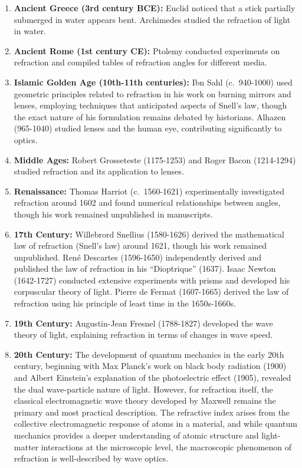 \documentclass[
  a4paper,
]{book}
\begin{document}
\begin{tcolorbox}
\begin{enumerate}
\def\labelenumi{\arabic{enumi}.}
\item
  \textbf{Ancient Greece (3rd century BCE):} Euclid noticed that a stick
  partially submerged in water appears bent. Archimedes studied the
  refraction of light in water.
\item
  \textbf{Ancient Rome (1st century CE):} Ptolemy conducted experiments
  on refraction and compiled tables of refraction angles for different
  media.
\item
  \textbf{Islamic Golden Age (10th-11th centuries):} Ibn Sahl
  (c.~940-1000) used geometric principles related to refraction in his
  work on burning mirrors and lenses, employing techniques that
  anticipated aspects of Snell's law, though the exact nature of his
  formulation remains debated by historians. Alhazen (965-1040) studied
  lenses and the human eye, contributing significantly to optics.
\item
  \textbf{Middle Ages:} Robert Grosseteste (1175-1253) and Roger Bacon
  (1214-1294) studied refraction and its application to lenses.
\item
  \textbf{Renaissance:} Thomas Harriot (c.~1560-1621) experimentally
  investigated refraction around 1602 and found numerical relationships
  between angles, though his work remained unpublished in manuscripts.
\item
  \textbf{17th Century:} Willebrord Snellius (1580-1626) derived the
  mathematical law of refraction (Snell's law) around 1621, though his
  work remained unpublished. René Descartes (1596-1650) independently
  derived and published the law of refraction in his ``Dioptrique''
  (1637). Isaac Newton (1642-1727) conducted extensive experiments with
  prisms and developed his corpuscular theory of light. Pierre de Fermat
  (1607-1665) derived the law of refraction using his principle of least
  time in the 1650s-1660s.
\item
  \textbf{19th Century:} Augustin-Jean Fresnel (1788-1827) developed the
  wave theory of light, explaining refraction in terms of changes in
  wave speed.
\item
  \textbf{20th Century:} The development of quantum mechanics in the
  early 20th century, beginning with Max Planck's work on black body
  radiation (1900) and Albert Einstein's explanation of the
  photoelectric effect (1905), revealed the dual wave-particle nature of
  light. However, for refraction itself, the classical electromagnetic
  wave theory developed by Maxwell remains the primary and most
  practical description. The refractive index arises from the collective
  electromagnetic response of atoms in a material, and while quantum
  mechanics provides a deeper understanding of atomic structure and
  light-matter interactions at the microscopic level, the macroscopic
  phenomenon of refraction is well-described by wave optics.
\end{enumerate}

\end{tcolorbox}
\end{document}
